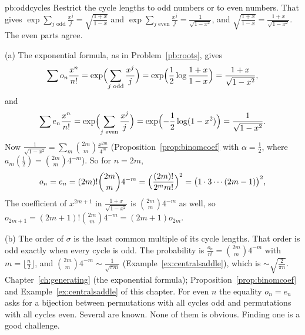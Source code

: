 \begin{solution}{pb:oddcycles}
\idea Restrict the cycle lengths to odd numbers or to even numbers. That gives $\exp\sum_{j\text{ odd}}\frac{x^j}j=\sqrt{\frac{1+x}{1-x}}$ and $\exp\sum_{j\text{ even}}\frac{x^j}j=\frac1{\sqrt{1-x^2}}$, and $\sqrt{\frac{1+x}{1-x}}=\frac{1+x}{\sqrt{1-x^2}}$. The even parts agree.

\writeup (a) The exponential formula, as in Problem~\ref{pb:roots}, gives
\[
\sum o_n\frac{x^n}{n!}=\exp\Bigl(\sum_{j\text{ odd}}\frac{x^j}j\Bigr)=\exp\Bigl(\frac12\log\frac{1+x}{1-x}\Bigr)=\frac{1+x}{\sqrt{1-x^2}},
\]
and
\[
\sum e_n\frac{x^n}{n!}=\exp\Bigl(\sum_{j\text{ even}}\frac{x^j}j\Bigr)=\exp\Bigl(-\frac12\log(1-x^2)\Bigr)=\frac1{\sqrt{1-x^2}}.
\]
Now $\frac1{\sqrt{1-x^2}}=\sum_m\binom{2m}m\frac{x^{2m}}{4^m}$ (Proposition~\ref{prop:binomcoef} with $\alpha=\frac12$, where $a_m(\frac12)=\binom{2m}m4^{-m}$). So for $n=2m$,
\[
o_n=e_n=(2m)!\binom{2m}m4^{-m}=\Bigl(\frac{(2m)!}{2^mm!}\Bigr)^2=\bigl(1\cdot3\cdots(2m-1)\bigr)^2,
\]
The coefficient of $x^{2m+1}$ in $\frac{1+x}{\sqrt{1-x^2}}$ is $\binom{2m}m4^{-m}$ as well, so $o_{2m+1}=(2m+1)!\binom{2m}m4^{-m}=(2m+1)o_{2m}$.

(b) The order of $\sigma$ is the least common multiple of its cycle lengths. That order is odd exactly when every cycle is odd. The probability is $\frac{o_n}{n!}=\binom{2m}m4^{-m}$ with $m=\lfloor\frac n2\rfloor$, and $\binom{2m}m4^{-m}\sim\frac1{\sqrt{\pi m}}$ (Example~\ref{ex:centralsaddle}), which is $\sim\sqrt{\frac2{\pi n}}$.
\tools Chapter~\ref{ch:generating} (the exponential formula); Proposition~\ref{prop:binomcoef} and Example~\ref{ex:centralsaddle} of this chapter.
\leads For even $n$ the equality $o_n=e_n$ asks for a bijection between permutations with all cycles odd and permutations with all cycles even. Several are known. None of them is obvious. Finding one is a good challenge.
\end{solution}

